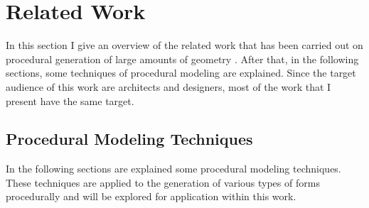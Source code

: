 
% 
% 

\section{Related Work}
\label{sec:related_work}

In this section I give an overview of the related work that has been carried out on procedural generation of large amounts of geometry	. After that, in the following sections, some techniques of procedural modeling are explained.
Since the target audience of this work are architects and designers, most of the work that I present have the same target.








\subsection{Procedural Modeling Techniques} %
\label{sub:procedural_modeling_techniques}

In the following sections are explained some procedural modeling techniques. These techniques are applied to the generation of various types of forms procedurally and will be explored for application within this work.










%



%

%

%


